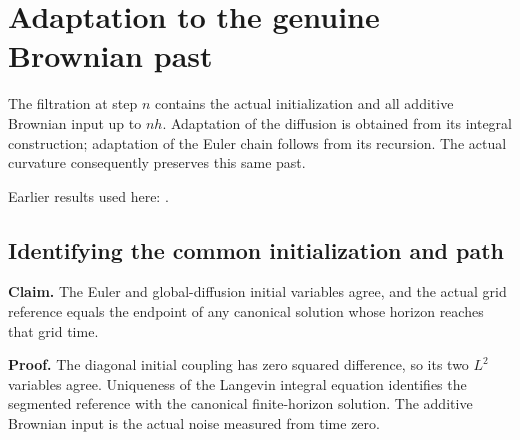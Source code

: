 \documentclass[11pt,a4paper]{report}
\begin{document}
\section{\texorpdfstring{Adaptation to the genuine Brownian past}{Adaptation to the genuine Brownian past}}
\label{proof-module-WassersteinMixing-ActualAdapted-lean}


The filtration at step \(n\) contains the actual initialization and all additive Brownian input up to \(nh\). Adaptation of the diffusion is obtained from its integral construction; adaptation of the Euler chain follows from its recursion. The actual curvature consequently preserves this same past.



Earlier results used here: \cite[Section~3.54]{LangevinLean2026ULASC}.
\subsection{\texorpdfstring{Identifying the common initialization and path}{Identifying the common initialization and path}}
\label{report-step-WassersteinMixing-ActualAdapted-lean-1}


\textbf{Claim.} The Euler and global-diffusion initial variables agree, and the actual grid reference equals the endpoint of any canonical solution whose horizon reaches that grid time.



\textbf{Proof.} The diagonal initial coupling has zero squared difference, so its two \(L^2\) variables agree. Uniqueness of the Langevin integral equation identifies the segmented reference with the canonical finite-horizon solution. The additive Brownian input is the actual noise measured from time zero.
\end{document}
